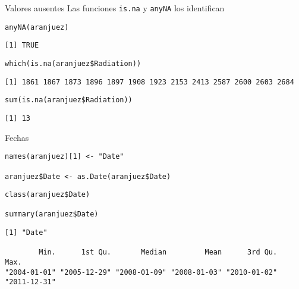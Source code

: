 \documentclass[aspectratio=169, usenames,svgnames,dvipsnames]{beamer}
\begin{document}
\begin{frame}[label={sec:org4d8f3f9},fragile]{Valores ausentes}
 Las funciones \texttt{is.na} y \texttt{anyNA} los identifican 
\lstset{language=r,label= ,caption= ,captionpos=b,numbers=none}
\begin{lstlisting}
anyNA(aranjuez)
\end{lstlisting}

\begin{verbatim}
[1] TRUE
\end{verbatim}


\lstset{language=r,label= ,caption= ,captionpos=b,numbers=none}
\begin{lstlisting}
which(is.na(aranjuez$Radiation))
\end{lstlisting}

\begin{verbatim}
[1] 1861 1867 1873 1896 1897 1908 1923 2153 2413 2587 2600 2603 2684
\end{verbatim}


\lstset{language=r,label= ,caption= ,captionpos=b,numbers=none}
\begin{lstlisting}
sum(is.na(aranjuez$Radiation))
\end{lstlisting}

\begin{verbatim}
[1] 13
\end{verbatim}
\end{frame}

\begin{frame}[label={sec:org519e8fe},fragile]{Fechas}
 \lstset{language=r,label= ,caption= ,captionpos=b,numbers=none}
\begin{lstlisting}
names(aranjuez)[1] <- "Date"

aranjuez$Date <- as.Date(aranjuez$Date)
\end{lstlisting}

\lstset{language=r,label= ,caption= ,captionpos=b,numbers=none}
\begin{lstlisting}
class(aranjuez$Date)

summary(aranjuez$Date)
\end{lstlisting}

\begin{verbatim}
[1] "Date"

        Min.      1st Qu.       Median         Mean      3rd Qu.         Max. 
"2004-01-01" "2005-12-29" "2008-01-09" "2008-01-03" "2010-01-02" "2011-12-31"
\end{verbatim}
\end{frame}
\end{document}
